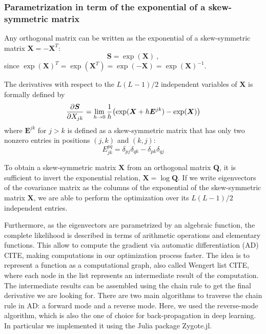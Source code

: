 \documentclass[preprint,amsmath,amssymb,superscriptaddress,showpacs,pre]{revtex4-1}
\let\originalleft\left
\let\originalright\right
\renewcommand{\left}{\mathopen{}\mathclose\bgroup\originalleft}
\renewcommand{\right}{\aftergroup\egroup\originalright}
\begin{document}
\subsubsection{Parametrization in term of the exponential of a skew-symmetric matrix }

Any orthogonal matrix can be written as the exponential of a skew-symmetric matrix $\bm X=-\bm X^T$: 
\begin{equation}
    \bm S=\exp (\bm X)\ ,
\end{equation}
since $\exp(\bm X)^T=\exp(\bm X^T)=\exp(-\bm X)=\exp(\bm X)^{-1}$. 
 
The derivatives with respect to the $L(L-1)/2$ independent variables of $\bm X$ is formally defined by
\begin{equation}
 \frac{\partial \bm S}{\partial X_{jk}}=\lim_{h\rightarrow 0} \frac{1}{h} \left( \exp(\bm X+ h \bm E^{jk}) - \exp(\bm X)\right) 
\end{equation}
where $\bm E^{jk}$ for $j > k$ is defined as a skew-symmetric matrix that has only two nonzero entries in positions $(j,k)$ and $(k,j)$:
\begin{equation}
    E^{pq}_{jk}=\delta_{pj}\delta_{qk}-\delta_{pk}\delta_{qj}
\end{equation}
 
To obtain a skew-symmetric matrix $\bm X$ from an orthogonal matrix $\bm Q$, it is sufficient to invert the exponential relation,
$\bm X=\log \bm Q$. If we write eigenvectors of the covariance matrix as the columns of the exponential of the skew-symmetric matrix $\bm X$, we are able to perform the optimization over its $L(L-1)/2$ independent entries.
 
Furthermore, as the eigenvectors are parametrized by an algebraic function, the complete likelihood is described in terms of arithmetic operations and elementary functions. This allow to compute the gradient via automatic differentiation (AD) 
{\color{red} CITE}, making computations in our optimization process faster. The idea  is to represent a function as a computational graph, also called Wengert list {\color{red} CITE}, where each node in the list represents an intermediate result of the computation. The intermediate results can be assembled using the chain rule to get the final derivative we are looking for. There are two main algorithms to traverse the chain rule in AD: a forward mode and a reverse mode. Here, we used the reverse-mode algorithm, which is also the one of choice for back-propagation in deep learning. In particular we implemented it using the Julia package Zygote.jl. 
 
\end{document}

